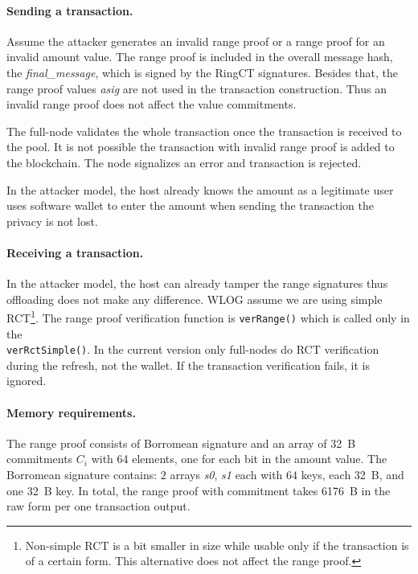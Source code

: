 \documentclass[]{article}
\begin{document}
\paragraph{Sending a transaction.}
Assume the attacker generates an invalid range proof or a range proof for an invalid amount value. The range proof is included in the overall message hash, the \emph{final\_message}, which is signed by the RingCT signatures. Besides that, the range proof values \emph{asig} are not used in the transaction construction. Thus an invalid range proof does not affect the value commitments. 

The full-node validates the whole transaction once the transaction is received to the pool. It is not possible the transaction with invalid range proof is added to the blockchain. The node signalizes an error and transaction is rejected.

In the attacker model, the host already knows the amount as a legitimate user uses software wallet to enter the amount when sending the transaction the privacy is not lost.

\paragraph{Receiving a transaction.}
In the attacker model, the host can already tamper the range signatures thus offloading does not make any difference.
WLOG assume we are using simple RCT\footnote{Non-simple RCT is a bit smaller in size while usable only if the transaction is of a certain form. This alternative does not affect the range proof.}. The range proof verification function is \verb|verRange()| which is called only in the \\\verb|verRctSimple()|. In the current version only full-nodes do RCT verification during the refresh, not the wallet. If the transaction verification fails, it is ignored.

\paragraph{Memory requirements.} 
The range proof consists of Borromean signature and an array of 32~B commitments $C_i$ with 64 elements, one for each bit in the amount value. The Borromean signature contains: $2$ arrays \emph{s0}, \emph{s1} each with $64$ keys, each 32~B, and one 32~B key. In total, the range proof with commitment takes 6176~B in the raw form per one transaction output.
\end{document}
